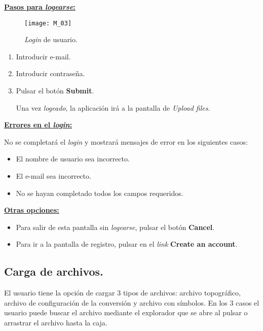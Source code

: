 \textbf{\underline{Pasos para \emph{logearse}:} }


\begin{figure}[H]
	\centering
	\texttt{[image: M\_03]}
	\caption{\emph{Login} de usuario.}
	\label{fig:M_03}
\end{figure}


\begin{enumerate}

\item Introducir e-mail.
\item Introducir contraseña.
\item Pulsar el botón \textbf{Submit}.

Una vez \emph{logeado}, la aplicación irá a la pantalla de \emph{Upload files}.

\end{enumerate}
\newpage

\textbf{\underline{Errores en el \emph{login}:} }

No se completará el \emph{login} y mostrará mensajes de error en los siguientes casos:

\begin{itemize}
\item El nombre de usuario sea incorrecto.
\item El e-mail sea incorrecto.
\item No se hayan completado todos los campos requeridos.
\end{itemize}

\textbf{\underline{Otras opciones:} }

\begin{itemize}

\item Para salir de esta pantalla sin \emph{logearse}, pulsar el botón \textbf{Cancel}.
\item Para ir a la pantalla de registro, pulsar en el \emph{link} \textbf{Create an account}.

\end{itemize}


\subsection{Carga de archivos.}

El usuario tiene la opción de cargar 3 tipos de archivos: archivo topográfico, archivo de configuración de la conversión y archivo con símbolos. En los 3 casos el usuario puede buscar el archivo mediante el explorador que se abre al pulsar o arrastrar el archivo hasta la caja.

